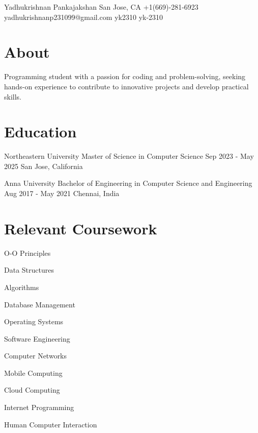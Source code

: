 \documentclass[letterpaper]{resume_config}
\begin{document}
\Header
    {Yadhukrishnan Pankajakshan} %
    {San Jose, CA} %
    {+1(669)-281-6923} %
    {yadhukrishnanp231099@gmail.com} %
    {yk2310} %
    {yk-2310}

\section{About}
{
    Programming student with a passion for coding and problem-solving, seeking hands-on experience to contribute to innovative projects and develop practical skills.
}

\section{Education}

\EducationExperience
    {Northeastern University} %
    {Master of Science in Computer Science} %
    {Sep 2023 - May 2025} %
    {San Jose, California} %

\EducationExperience
    {Anna University} %
    {Bachelor of Engineering in Computer Science and Engineering} %
    {Aug 2017 - May 2021} %
    {Chennai, India} %
\vspace{-5pt}


\section{Relevant Coursework}
\begin{SkillsList}{
    \item{O-O Principles}
    \item{Data Structures}
    \item{Algorithms}
    \item{Database Management}
    \item{Operating Systems}
    \item{Software Engineering}
    \item{Computer Networks}
    \item{Mobile Computing}
    \item{Cloud Computing}
    \item{Internet Programming}
    \item{Human Computer Interaction}
}
\end{SkillsList}
\end{document}
